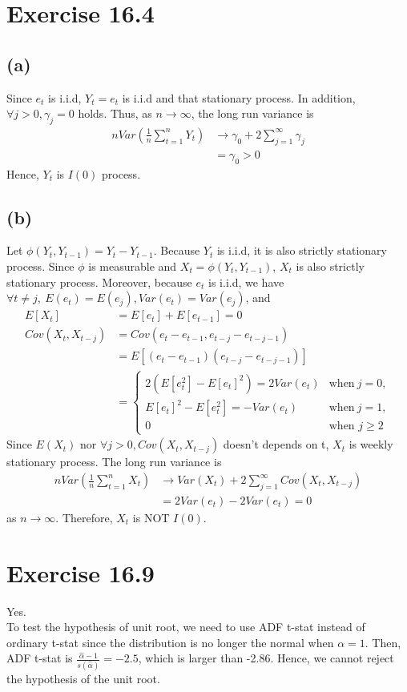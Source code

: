 \documentclass{article}
\begin{document}
\section{Exercise 16.4}
\subsection{(a)}
Since $e_t$ is i.i.d, $Y_t=e_t$ is i.i.d and that stationary process.
In addition, $\forall j>0, \gamma_j=0$ holds. Thus, as $n\rightarrow\infty$, the long run variance is
\begin{align*}
    nVar(\frac{1}{n}\sum_{t=1}^nY_t)&\rightarrow\gamma_0+2\sum_{j=1}^{\infty}\gamma_j\\
    &=\gamma_0>0
\end{align*}
Hence, $Y_t$ is $I(0)$ process.
\subsection{(b)}
Let $\phi(Y_t,Y_{t-1})=Y_t-Y_{t-1}$. Because $Y_t$ is i.i.d, it is also strictly stationary process. Since $\phi$ is measurable and $X_t = \phi(Y_t,Y_{t-1})$, $X_t$ is also strictly stationary process.
Moreover, because $e_t$ is i.i.d, we have $\forall t\neq j,\  E(e_t)=E(e_j), Var(e_t)=Var(e_j)$, and 
\begin{align*}
    E[X_t]&=E[e_t]+E[e_{t-1}]=0\\
    Cov(X_t,X_{t-j})&=Cov(e_t-e_{t-1},e_{t-j}-e_{t-j-1})\\
    &=E[(e_t-e_{t-1})(e_{t-j}-e_{t-j-1})]\\
    &=\begin{cases}
        2(E[e_t^2]-E[e_t]^2)=2Var(e_t) & \text{when}\ j=0,\\
        E[e_t]^2-E[e_t^2]=-Var(e_t) & \text{when}\ j=1,\\
        0 & \text{when }j\ge2
    \end{cases}
\end{align*}
Since $E(X_t)$ nor $\forall j>0, Cov(X_t,X_{t-j})$ doesn't depends on t, $X_t$ is weekly stationary process.
The long run variance is
\begin{align*}
 nVar\left(\frac{1}{n}\sum_{t=1}^n X_t\right) 
&\rightarrow Var(X_t)+2\sum_{j=1}^\infty Cov(X_t,X_{t-j})\\
&=2Var(e_t)-2Var(e_t)=0
\end{align*}
as $n\rightarrow\infty$.
Therefore, $X_t$ is NOT $I(0)$.
\section{Exercise 16.9}
Yes.\\
To test the hypothesis of unit root, we need to use ADF t-stat instead of ordinary t-stat since the distribution is no longer the normal when $\alpha = 1$.
Then, ADF t-stat is $\frac{\hat{\alpha}-1}{s(\hat{\alpha})}=-2.5$, which is larger than -2.86. Hence, we cannot reject the hypothesis of the unit root.
\end{document}
